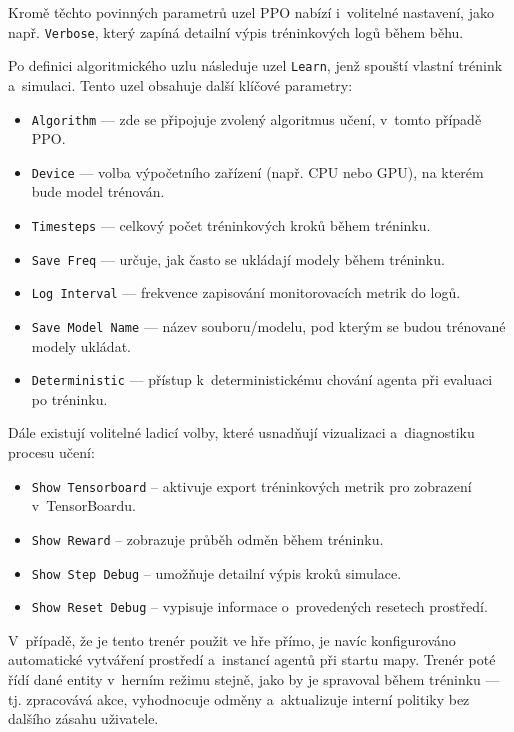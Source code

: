 Kromě těchto povinných parametrů uzel PPO nabízí i~volitelné nastavení, jako např. \texttt{Verbose}, který zapíná detailní výpis tréninkových logů během běhu.

\newpage

Po definici algoritmického uzlu následuje uzel \texttt{Learn}, jenž spouští vlastní trénink a~simulaci. Tento uzel obsahuje další klíčové parametry:

\begin{itemize}
    \item \texttt{Algorithm} — zde se připojuje zvolený algoritmus učení, v~tomto případě PPO.
    \item \texttt{Device} — volba výpočetního zařízení (např. CPU nebo GPU), na kterém bude model trénován.
    \item \texttt{Timesteps} — celkový počet tréninkových kroků během tréninku.
    \item \texttt{Save Freq} — určuje, jak často se ukládají modely během tréninku.
    \item \texttt{Log Interval} — frekvence zapisování monitorovacích metrik do logů.
    \item \texttt{Save Model Name} — název souboru/modelu, pod kterým se budou trénované modely ukládat.
    \item \texttt{Deterministic} — přístup k~deterministickému chování agenta při evaluaci po tréninku.
\end{itemize}

Dále existují volitelné ladicí volby, které usnadňují vizualizaci a~diagnostiku procesu učení:
\begin{itemize}
    \item \texttt{Show Tensorboard} – aktivuje export tréninkových metrik pro zobrazení v~TensorBoardu.
    \item \texttt{Show Reward} – zobrazuje průběh odměn během tréninku.
    \item \texttt{Show Step Debug} – umožňuje detailní výpis kroků simulace.
    \item \texttt{Show Reset Debug} – vypisuje informace o~provedených resetech prostředí.
\end{itemize}

V~případě, že je tento trenér použit ve hře přímo, je navíc konfigurováno automatické vytváření prostředí a~instancí agentů při startu mapy. Trenér poté řídí dané entity v~herním režimu stejně, jako by je spravoval během tréninku — tj. zpracovává akce, vyhodnocuje odměny a~aktualizuje interní politiky bez dalšího zásahu uživatele.

